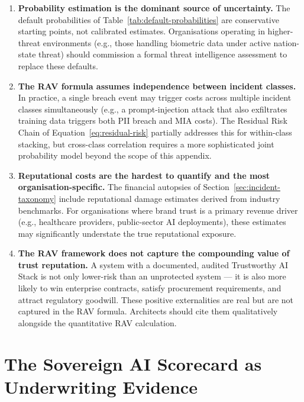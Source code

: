 \begin{enumerate}
  \item \textbf{Probability estimation is the dominant source
    of uncertainty.}
    The default probabilities of Table~\ref{tab:default-probabilities}
    are conservative starting points, not calibrated estimates.
    Organisations operating in higher-threat environments
    (e.g., those handling biometric data under active
    nation-state threat) should commission a formal threat
    intelligence assessment to replace these defaults.

  \item \textbf{The RAV formula assumes independence between
    incident classes.}
    In practice, a single breach event may trigger costs
    across multiple incident classes simultaneously
    (e.g., a prompt-injection attack that also exfiltrates
    training data triggers both PII breach and MIA costs).
    The Residual Risk Chain of
    Equation~\eqref{eq:residual-risk} partially addresses
    this for within-class stacking, but cross-class
    correlation requires a more sophisticated joint
    probability model beyond the scope of this appendix.

  \item \textbf{Reputational costs are the hardest to
    quantify and the most organisation-specific.}
    The financial autopsies of
    Section~\ref{sec:incident-taxonomy} include reputational
    damage estimates derived from industry benchmarks.
    For organisations where brand trust is a primary revenue
    driver (e.g., healthcare providers, public-sector AI
    deployments), these estimates may significantly
    understate the true reputational exposure.

  \item \textbf{The RAV framework does not capture the
    compounding value of trust reputation.}
    A system with a documented, audited Trustworthy AI Stack
    is not only lower-risk than an unprotected system ---
    it is also more likely to win enterprise contracts,
    satisfy procurement requirements, and attract regulatory
    goodwill.
    These positive externalities are real but are not
    captured in the RAV formula.
    Architects should cite them qualitatively alongside the
    quantitative RAV calculation.
\end{enumerate}

\section{The Sovereign AI Scorecard as Underwriting Evidence}
\label{sec:ai-insurance}

